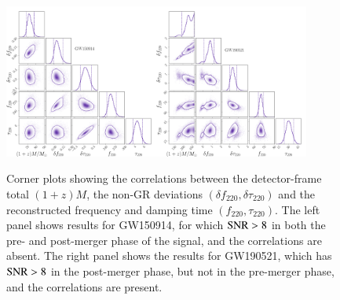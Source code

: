 \documentclass[twocolumn,prd,aps,superscriptaddress,preprintnumbers,tightenlines,showpacs,nofootinbib,eqsecnum,amsfonts,amsmath]{revtex4-1}
\newcommand{\df}[1]{\delta f_{\text{#1}}}
\newcommand{\dtau}[1]{\delta \tau_{\text{#1}}}
\begin{document}
\begin{figure}
\begin{center}
        \includegraphics[width=0.45\textwidth]{figures/mtotal_qnm_params_degeneracy_GW150914.pdf}\includegraphics[width=0.45\textwidth]{figures/mtotal_qnm_params_degeneracy_S190521g.pdf}
        \caption{Corner plots showing the correlations between the detector-frame total $(1+z)M$, the non-GR deviations $(\df{220}, \dtau{220})$ and the reconstructed frequency and damping time $(f_{220},\tau _{220})$. The left panel shows results for GW150914, for which ${\rm SNR}> 8$ in both the pre- and
post-merger phase of the signal, and the correlations are absent. The right panel shows the results for GW190521,  which has ${\rm SNR}> 8$ in the post-merger phase, but not in the pre-merger phase, and the correlations are present.}
        \label{fig:correlations}
\end{center}
\end{figure}


%


\end{document}
